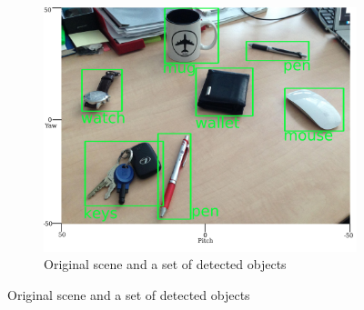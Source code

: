 \documentclass[a4paper,twoside]{article}
\begin{document}
	
	\begin{figure}[th!]
		\center
		\begin{subfigure}{1.0\columnwidth}
			\center
			\includegraphics[width=0.6\columnwidth]{img/map_ticks.jpg}
			\caption{Original scene and a set of detected objects}
			\label{fig:object-detection}
		\end{subfigure}
		

\end{figure}
\end{document}

